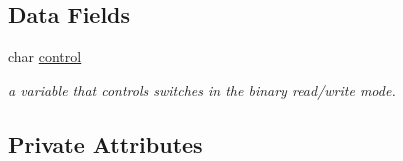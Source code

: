 \subsection*{Data Fields}
\begin{DoxyCompactItemize}
\item 
\hypertarget{classprofile__header_a9bc6c1d4a979d36d060896cd2ee4d593}{char \hyperlink{classprofile__header_a9bc6c1d4a979d36d060896cd2ee4d593}{control}}\label{classprofile__header_a9bc6c1d4a979d36d060896cd2ee4d593}

\begin{DoxyCompactList}\small\item\em a variable that controls switches in the binary read/write mode. \end{DoxyCompactList}\end{DoxyCompactItemize}
\subsection*{Private Attributes}
